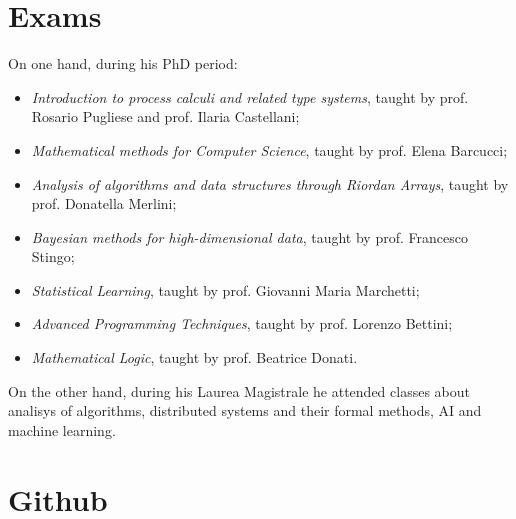 \documentclass[a4paper]{article} %
\begin{document}
    \section{Exams}

    On one hand, during his PhD period:
    \begin{itemize}
     \item \textit{Introduction to process calculi and related type systems}, taught by prof. Rosario Pugliese and prof. Ilaria Castellani;
     \item \textit{Mathematical methods for Computer Science}, taught by prof. Elena Barcucci;
     \item \textit{Analysis of algorithms and data structures through Riordan Arrays}, taught by prof. Donatella Merlini;
     \item \textit{Bayesian methods for high-dimensional data}, taught by prof. Francesco Stingo;
     \item \textit{Statistical Learning}, taught by prof. Giovanni Maria Marchetti;
     \item \textit{Advanced Programming Techniques}, taught by prof. Lorenzo Bettini;
     \item \textit{Mathematical Logic}, taught by prof. Beatrice Donati.
    \end{itemize}

    On the other hand, during his Laurea Magistrale he attended classes about
    analisys of algorithms, distributed systems and their formal methods, AI
    and machine learning.

    \section{Github}
\end{document}
